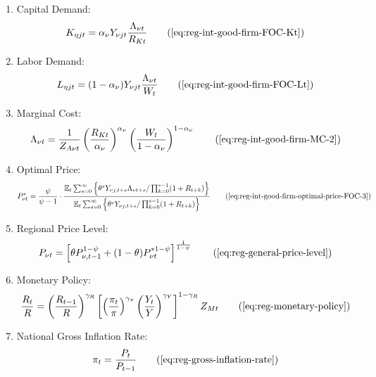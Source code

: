 \documentclass[
thesis.tex
]{subfiles}
\begin{document}
{\begin{itemize}
\begin{enumerate}
		\item Capital Demand:
		\begin{align}
			K_{\eta jt} = {\alpha_\nu} Y_{\nu jt} \frac{\Lambda_{\nu t}}{R_{Kt}} \tag{\ref{eq:reg-int-good-firm-FOC-Kt}}
		\end{align}

		\item Labor Demand:
		\begin{align}
			L_{\eta jt} = (1-{\alpha_\nu}) Y_{\nu jt} \frac{\Lambda_{\nu t}}{W_t} \tag{\ref{eq:reg-int-good-firm-FOC-Lt}}
		\end{align}

		\item Marginal Cost:
		\begin{align}
			\Lambda_{\nu t} = \frac{1}{Z_{A\nu t}} \left( \frac{R_{Kt}}{{\alpha_\nu}} \right)^{{\alpha_\nu}} \left( \frac{W_t}{1-{\alpha_\nu}} \right)^{1-{\alpha_\nu}} \tag{\ref{eq:reg-int-good-firm-MC-2}}
		\end{align}
			
		\item Optimal Price:
		\begin{align}
			P_{\nu t}^\ast = \frac{\psi}{\psi-1} \cdot \frac{ \E \sum_{s=0}^{\infty} \left\{ \theta^s Y_{\nu j,t+s} \Lambda_{\nu t+s} / \prod_{k=0}^{s-1}(1+R_{t+k}) \right\} } {\E \sum_{s=0}^{\infty} \left\{ \theta^s Y_{\nu j,t+s} / \prod_{k=0}^{s-1}(1 + R_{t+k}) \right\}} \tag{\ref{eq:reg-int-good-firm-optimal-price-FOC-3}}
		\end{align}
			
		\item Regional Price Level:
		\begin{align}
			P_{\nu t} = \left[ \theta P_{\nu,t-1}^{1-\psi} + (1-\theta) P_{\nu t}^{\ast 1-\psi} \right]^\frac{1}{1-\psi} \tag{\ref{eq:reg-general-price-level}}
		\end{align}

		\item Monetary Policy:
		\begin{align}
			\frac{R_{t}}{R} = \left( \frac{R_{t-1}}{R} \right)^{\gamma_R} \left[ \left( \frac{\pi_t}{\pi} \right)^{\gamma_\pi} \left( \frac{Y_t}{Y} \right)^{\gamma_Y} \right]^{1-\gamma_R} Z_{Mt} \tag{\ref{eq:reg-monetary-policy}}
		\end{align}
			
		\item National Gross Inflation Rate:
		\begin{align}
			\pi_t = \frac{P_t}{P_{t-1}} \tag{\ref{eq:reg-gross-inflation-rate}}
		\end{align}
			

\end{enumerate}
\end{itemize}}
\end{document}
